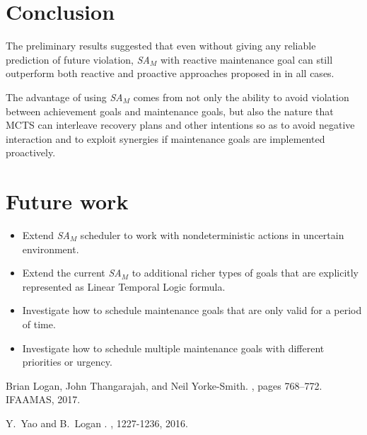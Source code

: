 \documentclass[portrait, plainsections]{sciposter}
\newcommand{\SAM}{\emph{SA}$_M$\xspace}
\begin{document}
\begin{multicols}{3}
\section*{Conclusion}
The preliminary results suggested that even without giving any reliable prediction of future violation, \SAM with reactive maintenance goal can still outperform both reactive and proactive approaches proposed in \cite{DuffHT06} in all cases.

The advantage of using \SAM comes from not only the ability to avoid violation between achievement goals and maintenance goals, but also the nature that MCTS can interleave recovery plans and other intentions so as to avoid negative interaction and to exploit synergies 
if maintenance goals are implemented proactively.

\section*{Future work}
\begin{itemize}
    \item Extend \SAM scheduler to work with nondeterministic actions in uncertain environment.
    \item Extend the current \SAM to additional richer types of goals that are explicitly represented as Linear Temporal Logic formula.
    \item Investigate how to schedule maintenance goals that are only valid for a period of time.
    \item Investigate how to schedule multiple maintenance goals with different priorities or urgency.
\end{itemize}

\small
\begin{thebibliography}{m}

Brian Logan, John Thangarajah, and Neil Yorke{-}Smith.
, pages 768--772. IFAAMAS, 2017.

Y.~Yao and B.~Logan .
, 1227-1236, 2016.


\end{thebibliography}


\end{multicols}
\end{document}
